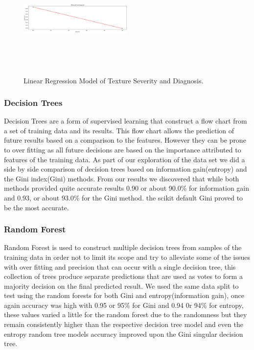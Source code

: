 \documentclass[conference]{IEEEtran}
\begin{document}
\begin{figure}[H]
\caption{Linear Regression Model of Texture Severity and Diagnosis.}
\centering
\includegraphics[height=60mm,width=0.5\textwidth]{Images/Texture_Diagnosis.png}
\end{figure}
\subsubsection{Decision Trees}
Decision Trees are a form of supervised learning that construct a flow chart from a set of training data and its results. This flow chart allows the prediction of future results based on a comparison to the features. However they can be prone to over fitting as all future decisions are based on the importance attributed to features of the training data. As part of our exploration of the data set we did a side by side comparison of decision trees based on information gain(entropy) and the Gini index(Gini) methods.
From our results we discovered that while both methods provided quite accurate results 0.90 or about 90.0\% for information gain and 0.93, or about 93.0\% for the Gini method. the scikit default Gini proved to be the most accurate.
\subsubsection{Random Forest} Random Forest is used to construct multiple decision trees from samples of the training data in order not to limit its scope and try to alleviate some of the issues with over fitting and precision that can occur with a single decision tree, this collection of trees produce separate predictions that are used as votes to form a majority decision on the final predicted result. We used the same data split to test using the random forests for both Gini and entropy(information gain), once again accuracy was high with 0.95 or 95\% for Gini and 0.94 0r 94\% for entropy, these values varied a little for the random forest due to the randomness but they remain consistently higher than the respective decision tree model and even the entropy random tree models accuracy improved upon the Gini singular decision tree. 
\end{document}
